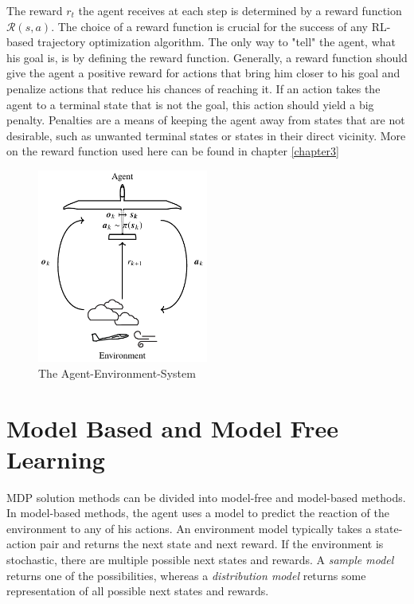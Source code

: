 The reward $r_t$ the agent receives at each step is determined by a reward function $\mathcal{R}(s,a)$. The choice of a reward function is crucial for the success of any RL-based trajectory optimization algorithm. The only way to "tell" the agent, what his goal is, is by defining the reward function. Generally, a reward function should give the agent a positive reward for actions that bring him closer to his goal and penalize actions that reduce his chances of reaching it. If an action takes the agent to a terminal state that is not the goal, this action should yield a big penalty. Penalties are a means of keeping the agent away from states that are not desirable, such as unwanted terminal states or states in their direct vicinity. More on the reward function used here can be found in chapter \ref{chapter3} 

\begin{figure}[h]
	\centering
	\includegraphics[width=0.5\textwidth]{src/pics/RLProblem.pdf}
	\caption{The Agent-Environment-System \cite{Notter2018}}
	\label{fig:agent_env_system} 
\end{figure}

\section{Model Based and Model Free Learning}

MDP solution methods can be divided into model-free and model-based methods. In model-based methods, the agent uses a model to predict the reaction of the environment to any of his actions. An environment model typically takes a state-action pair and returns the next state and next reward. If the environment is stochastic, there are multiple possible next states and rewards. A \textit{sample model} returns one of the possibilities, whereas a \textit{distribution model} returns some representation of all possible next states and rewards.

